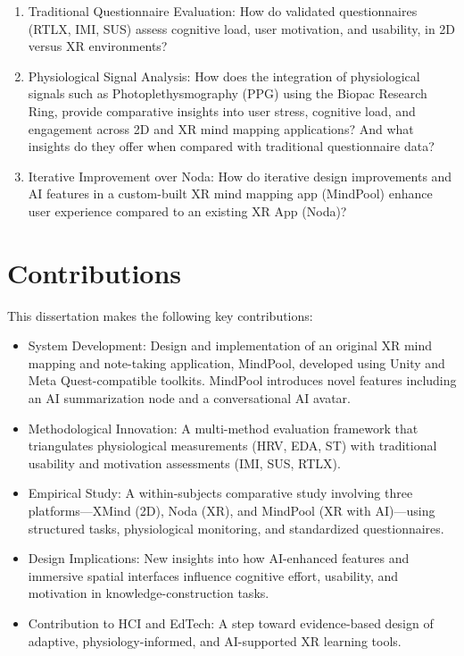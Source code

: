 \documentclass{CPP}
\begin{document}
\begin{enumerate}

    \item Traditional Questionnaire Evaluation: How do validated questionnaires (RTLX, IMI, SUS) assess cognitive load, user motivation, and usability, in 2D versus XR environments?

    \item Physiological Signal Analysis: How does the integration of physiological signals such as Photoplethysmography (PPG) using the Biopac Research Ring, provide comparative insights into user stress, cognitive load, and engagement across 2D and XR mind mapping applications? And what insights do they offer when compared with traditional questionnaire data?

    \item Iterative Improvement over Noda: How do iterative design improvements and AI features in a custom-built XR mind mapping app (MindPool) enhance user experience compared to an existing XR App (Noda)?
\end{enumerate}

\section{Contributions}

This dissertation makes the following key contributions:

\begin{itemize}
    \item System Development: Design and implementation of an original XR mind mapping and note-taking application, MindPool, developed using Unity and Meta Quest-compatible toolkits. MindPool introduces novel features including an AI summarization node and a conversational AI avatar.

    \item Methodological Innovation: A multi-method evaluation framework that triangulates physiological measurements (HRV, EDA, ST) with traditional usability and motivation assessments (IMI, SUS, RTLX).

    \item Empirical Study: A within-subjects comparative study involving three platforms—XMind (2D), Noda (XR), and MindPool (XR with AI)—using structured tasks, physiological monitoring, and standardized questionnaires.

    \item Design Implications: New insights into how AI-enhanced features and immersive spatial interfaces influence cognitive effort, usability, and motivation in knowledge-construction tasks.

    \item Contribution to HCI and EdTech: A step toward evidence-based design of adaptive, physiology-informed, and AI-supported XR learning tools.
\end{itemize}
\end{document}
